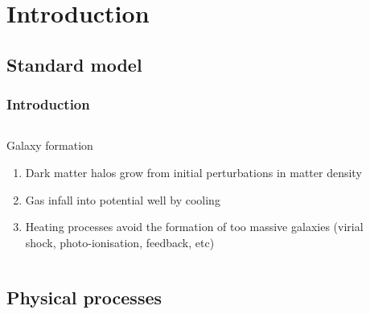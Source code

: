\section{Introduction}
\subsection{Standard model}

\begin{frame}
    \frametitle{Introduction}
    \begin{columns}
        \begin{column}{0.5\textwidth}
            \begin{block}{Galaxy formation}
                \begin{enumerate}
                    \item<1-> Dark matter halos grow from initial perturbations
                        in matter density
                    \item<2-> Gas infall into potential well by cooling
                    \item<3-> Heating processes avoid the formation of too
                        massive galaxies (virial shock, photo-ionisation,
                        feedback, etc)
                \end{enumerate}
            \end{block}
        \end{column}
        \begin{column}{0.5\textwidth}
            \begin{minipage}[c][0.6\textheight][c]{\linewidth}
            \end{minipage}
        \end{column}
    \end{columns}
\end{frame}

\subsection{Physical processes}

